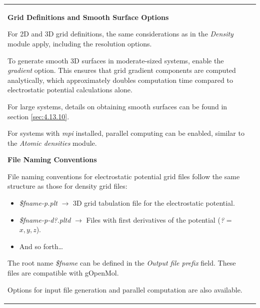 \documentclass[10pt]{article}
\begin{document}
\begin{tabular}{lr}
\hspace*{-3mm}
\begin{minipage}{.6\linewidth}


\vspace*{3mm}
{\bf Grid Definitions and Smooth Surface Options}
\vspace*{3mm}

For 2D and 3D grid definitions, the same considerations as in the {\it Density} module apply,
including the resolution options.

To generate smooth 3D surfaces in moderate-sized systems,
enable the {\it gradient}\index{electrostatic potential!gradient} option.
This ensures that grid gradient components are computed analytically,
which approximately doubles computation time compared to electrostatic potential calculations alone.

For large systems, details on obtaining smooth surfaces can be found in section \ref{sec:4.13.10}\index{smooth surfaces}.

For systems with {\it mpi} installed, parallel computing can be enabled,
similar to the {\it Atomic densities} module.

\vspace*{3mm}
{\bf File Naming Conventions}
\vspace*{3mm}

File naming conventions for electrostatic potential grid files\index{electrostatic potential!grid}
follow the same structure as those for density grid files:

\begin{itemize}
\item {\it \$fname-p.plt} $\rightarrow$ 3D grid tabulation file for the electrostatic potential.
\item {\it \$fname-p-d?.pltd} $\rightarrow$ Files with first derivatives of the potential ({\it ?} = $x, y, z$).
\item And so forth…
\end{itemize}

The root name {\it \$fname} can be defined in the {\it Output file prefix} field.
These files are compatible with gOpenMol.

Options for input file generation and parallel computation are also available.

\end{minipage}
&
\begin{minipage}{.4\linewidth}


\end{minipage}
\end{tabular}
\end{document}
